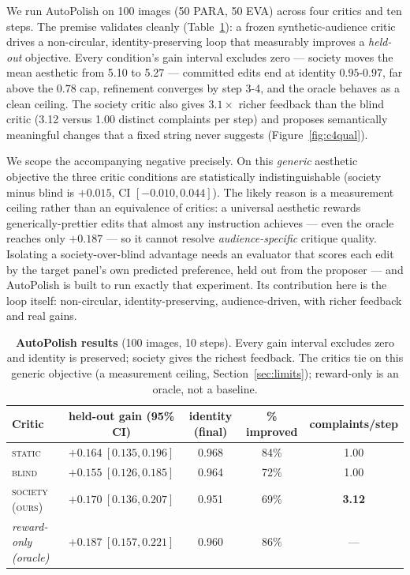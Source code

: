 \documentclass{article}
\begin{document}
We run AutoPolish on 100 images (50 PARA, 50 EVA) across four critics and ten steps. The premise validates cleanly (Table~\ref{tab:c4}): a frozen synthetic-audience critic drives a non-circular, identity-preserving loop that measurably improves a \emph{held-out} objective. Every condition's gain interval excludes zero --- society moves the mean aesthetic from 5.10 to 5.27 --- committed edits end at identity $0.95$-$0.97$, far above the $0.78$ cap, refinement converges by step 3-4, and the oracle behaves as a clean ceiling. The society critic also gives $3.1\times$ richer feedback than the blind critic (3.12 versus 1.00 distinct complaints per step) and proposes semantically meaningful changes that a fixed string never suggests (Figure~\ref{fig:c4qual}).

We scope the accompanying negative precisely. On this \emph{generic} aesthetic objective the three critic conditions are statistically indistinguishable (society minus blind is $+0.015$, CI $[-0.010, 0.044]$). The likely reason is a measurement ceiling rather than an equivalence of critics: a universal aesthetic rewards generically-prettier edits that almost any instruction achieves --- even the oracle reaches only $+0.187$ --- so it cannot resolve \emph{audience-specific} critique quality. Isolating a society-over-blind advantage needs an evaluator that scores each edit by the target panel's own predicted preference, held out from the proposer --- and AutoPolish is built to run exactly that experiment. Its contribution here is the loop itself: non-circular, identity-preserving, audience-driven, with richer feedback and real gains.

\begin{table}[t]
  \caption{\textbf{AutoPolish results} (100 images, 10 steps). Every gain interval excludes zero and identity is preserved; society gives the richest feedback. The critics tie on this generic objective (a measurement ceiling, Section~\ref{sec:limits}); reward-only is an oracle, not a baseline.}
  \label{tab:c4}
  \centering
  \small
  \setlength{\tabcolsep}{4.5pt}
  \begin{tabular}{lcccc}
    \toprule
    Critic & held-out gain (95\% CI) & identity (final) & \% improved & complaints/step \\
    \midrule
    \textsc{static}      & $+0.164\ [0.135, 0.196]$ & 0.968 & 84\% & 1.00 \\
    \textsc{blind}       & $+0.155\ [0.126, 0.185]$ & 0.964 & 72\% & 1.00 \\
    \textsc{society (ours)} & $+0.170\ [0.136, 0.207]$ & 0.951 & 69\% & \textbf{3.12} \\
    \midrule
    \textit{reward-only (oracle)} & $+0.187\ [0.157, 0.221]$ & 0.960 & 86\% & --- \\
    \bottomrule
  \end{tabular}
\end{table}
\end{document}

